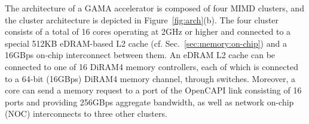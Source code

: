 
The architecture of a GAMA accelerator is composed of four MIMD clusters, and the cluster architecture is depicted in Figure~\ref{fig:arch}(b).
The four cluster consists of a total of 16 cores operating at 2GHz or higher and connected to a special 512KB eDRAM-based L2 cache (cf. Sec.~\ref{sec:memory:on-chip}) and a 16GBps on-chip interconnect between them. 
An eDRAM L2 cache can be connected to one of 16 DiRAM4 memory controllers, each of which is connected to a 64-bit (16GBps) DiRAM4 memory channel, through switches.
Moreover, a core can send a memory request to a port of the OpenCAPI link consisting of 16 ports and providing 256GBps aggregate bandwidth, 
as well as network on-chip (NOC) interconnects to three other clusters.  

